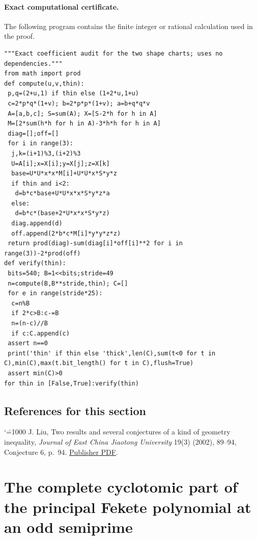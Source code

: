 \documentclass[11pt,a4paper]{article}
\makeatletter
\numberwithin{equation}{section}
\theoremstyle{definition}
\theoremstyle{remark}
\renewenvironment{thebibliography}[1]
 {\subsection*{References for this section}\small
  \list{\@biblabel{\@arabic\c@enumiv}}
       {\settowidth\labelwidth{\@biblabel{#1}}\leftmargin\labelwidth
        \advance\leftmargin\labelsep\@openbib@code
        \usecounter{enumiv}\let\p@enumiv\@empty
        \renewcommand\theenumiv{\@arabic\c@enumiv}}
  \sloppy\clubpenalty4000\widowpenalty4000\sfcode`\.=1000\relax}
 {\def\@noitemerr{\@latex@warning{Empty bibliography}}\endlist}
\makeatother
\begin{document}
\paragraph{Exact computational certificate.}
The following program contains the finite integer or rational calculation used in the proof.
{\small
\begin{Verbatim}
"""Exact coefficient audit for the two shape charts; uses no dependencies."""
from math import prod
def compute(u,v,thin):
 p,q=(2+u,1) if thin else (1+2*u,1+u)
 c=2*p*q*(1+v); b=2*p*p*(1+v); a=b+q*q*v
 A=[a,b,c]; S=sum(A); X=[S-2*h for h in A]
 M=[2*sum(h*h for h in A)-3*h*h for h in A]
 diag=[];off=[]
 for i in range(3):
  j,k=(i+1)%3,(i+2)%3
  U=A[i];x=X[i];y=X[j];z=X[k]
  base=U*U*x*x*M[i]+U*U*x*S*y*z
  if thin and i<2:
   d=b*c*base+U*U*x*x*S*y*z*a
  else:
   d=b*c*(base+2*U*x*x*S*y*z)
  diag.append(d)
  off.append(2*b*c*M[i]*y*y*z*z)
 return prod(diag)-sum(diag[i]*off[i]**2 for i in range(3))-2*prod(off)
def verify(thin):
 bits=540; B=1<<bits;stride=49
 n=compute(B,B**stride,thin); C=[]
 for e in range(stride*25):
  c=n%B
  if 2*c>B:c-=B
  n=(n-c)//B
  if c:C.append(c)
 assert n==0
 print('thin' if thin else 'thick',len(C),sum(t<0 for t in C),min(C),max(t.bit_length() for t in C),flush=True)
 assert min(C)>0
for thin in [False,True]:verify(thin)
\end{Verbatim}

}

\begin{thebibliography}{1}
 J. Liu, Two results and several conjectures of a kind of geometry inequality, \emph{Journal of East China Jiaotong University} 19(3) (2002), 89--94, Conjecture 6, p.~94. \href{https://journal.ecjtu.edu.cn/hdjtdx/article/pdf/20020327}{Publisher PDF}.
\end{thebibliography}

\par\endgroup

\begingroup
\newcommand{\Q}{\mathbb Q}
\newcommand{\Z}{\mathbb Z}
\newcommand{\Ph}{\Phi}
\newcommand{\z}{\zeta}
\section{\texorpdfstring{The complete cyclotomic part of the principal Fekete polynomial at an odd semiprime}{The complete cyclotomic part of the principal Fekete polynomial at an odd semiprime}}\label{section:r47reiwa}
\par\medskip
\end{document}
